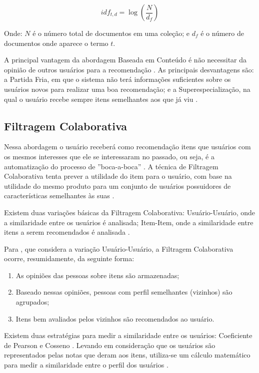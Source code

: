 \begin{equation}
  idf_{t,d} = \log(\frac{N}{d_f})
  \label{eq:idf}
\end{equation}

Onde: $N$ é o número total de documentos em uma coleção; e $d_f$ é o número de documentos onde aparece o termo $t$.

A principal vantagem da abordagem Baseada em Conteúdo é não necessitar da opinião de outros usuários para a recomendação
\cite{ricci2011introduction}. As principais desvantagens são: a Partida Fria, em que o sistema não terá informações
suficientes sobre os usuários novos para realizar uma boa recomendação; e a Superespecialização, na qual o
usuário recebe sempre itens semelhantes aos que já viu \cite{lops2011content}.

\subsection{Filtragem Colaborativa}

Nessa abordagem o usuário receberá como recomendação itens que usuários com os mesmos interesses que ele se
interessaram no passado, ou seja, é a automatização do processo de ''boca-a-boca'' \cite{jannach2010recommender}. A
técnica de Filtragem Colaborativa tenta prever a utilidade  do item para o usuário, com base na utilidade do mesmo
produto para um conjunto de usuários  possuidores de características semelhantes às suas \cite{jannach2010recommender}.

Existem duas variações básicas da Filtragem Colaborativa: Usuário-Usuário, onde a similaridade entre os usuários é analisada;
Item-Item, onde a similaridade entre itens a serem recomendados é analisada \cite{jannach2010recommender}.

Para , que considera a variação Usuário-Usuário, a Filtragem Colaborativa ocorre,
resumidamente, da seguinte forma:

\begin{enumerate}
\item As opiniões das pessoas sobre itens são armazenadas;
\item Baseado nessas opiniões, pessoas com perfil semelhantes (vizinhos) são agrupados;
\item Itens bem avaliados pelos vizinhos são recomendados ao usuário.
\end{enumerate}

Existem duas estratégias para medir a similaridade entre os usuários: Coeficiente de Pearson e Cosseno
\cite{torres2004personalizaccao}. Levando em consideração que os usuários são representados pelas notas que deram aos
itens, utiliza-se um cálculo matemático para medir a similaridade entre o perfil dos usuários
\cite{torres2004personalizaccao}.

